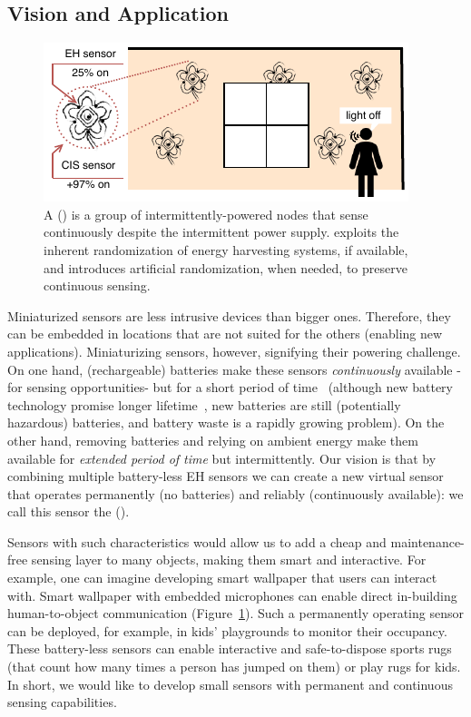 \subsection{Vision and Application}
%
\begin{figure}[t]
	\centering
	\includegraphics[width=\columnwidth]{figures/smart_fabric}
	\caption{A \fullcis (\cis) is a group of intermittently-powered nodes that sense continuously despite the intermittent power supply. \cis exploits the inherent randomization of energy harvesting systems, if available, and introduces artificial randomization, when needed, to preserve continuous sensing.}
	\label{fig:smart_fabric}
\end{figure}
%
Miniaturized sensors are less intrusive devices than bigger ones. Therefore, they can be embedded in locations that are not suited for the others (enabling new applications). Miniaturizing sensors, however, signifying their powering challenge.
On one hand, 
(rechargeable) 
%
batteries make these sensors \emph{continuously} available -for sensing opportunities- but for a short period of time~\cite{aditya2008comparison} 
(although new battery technology promise longer lifetime~\cite{jackson2018reconsidering, jackson_ipsn_2019}, new batteries are still (potentially hazardous) batteries, and battery waste is a rapidly growing problem). 
%
On the other hand, removing batteries and relying on ambient energy make them available for \emph{extended period of time} but intermittently. Our vision is that by combining multiple battery-less EH sensors we can create a new virtual sensor that operates permanently (no batteries) and reliably (continuously available): we call this sensor the \emph{\fullcis} (\cis).

Sensors with such characteristics would allow us to add a cheap and maintenance-free sensing layer to many objects, making them smart and interactive. For example, one can imagine developing smart wallpaper that users can interact with. 
Smart wallpaper with embedded microphones can enable direct in-building human-to-object communication (Figure~\ref{fig:smart_fabric}). Such a permanently operating sensor can be deployed, for example, in kids' playgrounds to monitor their occupancy. These battery-less sensors can enable
interactive and safe-to-dispose sports rugs (that count how many times a person has jumped on them) or play rugs for kids.
In short, we would like to develop small sensors with permanent and continuous sensing capabilities.  
%
